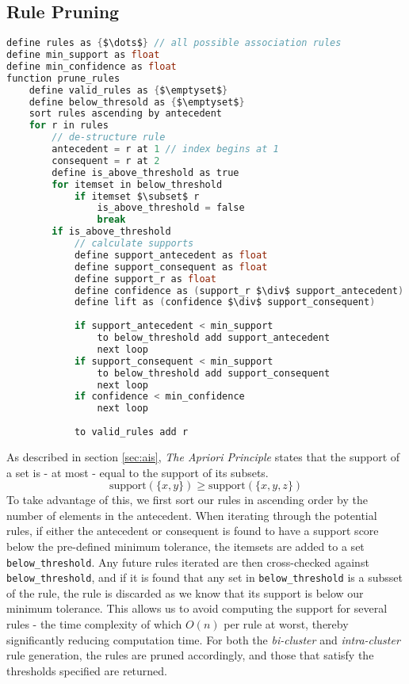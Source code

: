 \subsection{Rule Pruning}
\begin{lstlisting}[language=C, mathescape=true, caption=Rule Prune, label=lst:prune]
define rules as {$\dots$} // all possible association rules
define min_support as float
define min_confidence as float
function prune_rules
    define valid_rules as {$\emptyset$}
    define below_thresold as {$\emptyset$}
    sort rules ascending by antecedent
    for r in rules
        // de-structure rule
        antecedent = r at 1 // index begins at 1
        consequent = r at 2
        define is_above_threshold as true
        for itemset in below_threshold
            if itemset $\subset$ r
                is_above_threshold = false
                break
        if is_above_threshold
            // calculate supports
            define support_antecedent as float
            define support_consequent as float
            define support_r as float
            define confidence as (support_r $\div$ support_antecedent)
            define lift as (confidence $\div$ support_consequent)
            
            if support_antecedent < min_support
                to below_threshold add support_antecedent
                next loop
            if support_consequent < min_support
                to below_threshold add support_consequent
                next loop
            if confidence < min_confidence
                next loop
            
            to valid_rules add r
\end{lstlisting}
As described in section \ref{sec:ais}, \textit{The Apriori Principle} states that the support of a set is - at most - equal to the support of its subsets.
\[\text{support}(\{x,y\}) \geq \text{support}(\{x,y,z\})\]
To take advantage of this, we first sort our rules in ascending order by the number of elements in the antecedent. When iterating through the potential rules, if either the antecedent or consequent is found to have a support score below the pre-defined minimum tolerance, the itemsets are added to a set \texttt{below\_threshold}. Any future rules iterated are then cross-checked against \texttt{below\_threshold}, 
and if it is found that any set in \texttt{below\_threshold} is a subsset of the rule, the rule is discarded as we know that its support is below our minimum tolerance. This allows us to avoid computing the support for several rules - the time complexity of which $O(n)$ per rule at worst, thereby significantly reducing computation time. For both the \textit{bi-cluster} and \textit{intra-cluster} rule generation, the rules are pruned accordingly, and those that satisfy the thresholds specified are returned.

